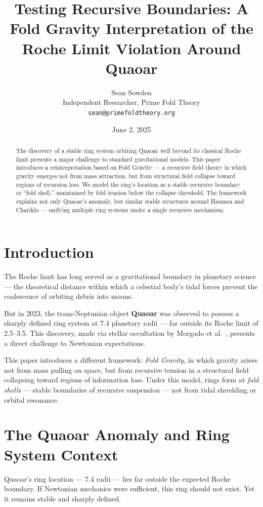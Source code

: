 \documentclass[12pt]{article}
\title{Testing Recursive Boundaries: A Fold Gravity Interpretation of the Roche Limit Violation Around Quaoar}
\author{
  Sean Sowden\\
  Independent Researcher, Prime Fold Theory\\
  \vspace{0.5em}
  \normalsize\texttt{sean@primefoldtheory.org}
  }
\date{June 2, 2025}
\begin{document}
\maketitle

\begin{abstract}
The discovery of a stable ring system orbiting Quaoar well beyond its classical Roche limit presents a major challenge to standard gravitational models. This paper introduces a reinterpretation based on Fold Gravity — a recursive field theory in which gravity emerges not from mass attraction, but from structural field collapse toward regions of recursion loss. We model the ring’s location as a stable recursive boundary or “fold shell,” maintained by fold tension below the collapse threshold. The framework explains not only Quaoar’s anomaly, but similar stable structures around Haumea and Chariklo — unifying multiple ring systems under a single recursive mechanism.
\end{abstract}

\section{Introduction}
The Roche limit has long served as a gravitational boundary in planetary science — the theoretical distance within which a celestial body’s tidal forces prevent the coalescence of orbiting debris into moons.

But in 2023, the trans-Neptunian object \textbf{Quaoar} was observed to possess a sharply defined ring system at 7.4 planetary radii — far outside its Roche limit of 2.5–3.5. This discovery, made via stellar occultation by Morgado et al.~\cite{morgado2023quaoar}, presents a direct challenge to Newtonian expectations.

This paper introduces a different framework: \textit{Fold Gravity}, in which gravity arises not from mass pulling on space, but from recursive tension in a structural field collapsing toward regions of information loss. Under this model, rings form at \textit{fold shells} — stable boundaries of recursive suspension — not from tidal shredding or orbital resonance.

\section{The Quaoar Anomaly and Ring System Context}
Quaoar’s ring location — 7.4 radii — lies far outside the expected Roche boundary. If Newtonian mechanics were sufficient, this ring should not exist. Yet it remains stable and sharply defined.
\end{document}

